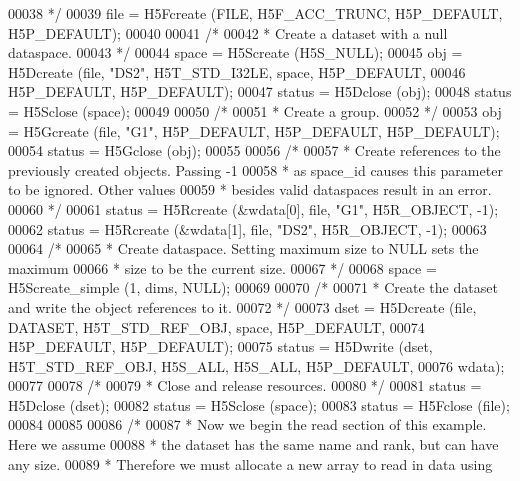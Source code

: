 \begin{DoxyCode}
00038 \textcolor{comment}{     */}
00039     file = H5Fcreate (FILE, H5F\_ACC\_TRUNC, H5P\_DEFAULT, H5P\_DEFAULT);
00040 
00041     \textcolor{comment}{/*}
00042 \textcolor{comment}{     * Create a dataset with a null dataspace.}
00043 \textcolor{comment}{     */}
00044     space = H5Screate (H5S\_NULL);
00045     obj = H5Dcreate (file, \textcolor{stringliteral}{"DS2"}, H5T\_STD\_I32LE, space, H5P\_DEFAULT,
00046                 H5P\_DEFAULT, H5P\_DEFAULT);
00047     status = H5Dclose (obj);
00048     status = H5Sclose (space);
00049 
00050     \textcolor{comment}{/*}
00051 \textcolor{comment}{     * Create a group.}
00052 \textcolor{comment}{     */}
00053     obj = H5Gcreate (file, \textcolor{stringliteral}{"G1"}, H5P\_DEFAULT, H5P\_DEFAULT, H5P\_DEFAULT);
00054     status = H5Gclose (obj);
00055 
00056     \textcolor{comment}{/*}
00057 \textcolor{comment}{     * Create references to the previously created objects.  Passing -1}
00058 \textcolor{comment}{     * as space\_id causes this parameter to be ignored.  Other values}
00059 \textcolor{comment}{     * besides valid dataspaces result in an error.}
00060 \textcolor{comment}{     */}
00061     status = H5Rcreate (&wdata[0], file, \textcolor{stringliteral}{"G1"}, H5R\_OBJECT, -1);
00062     status = H5Rcreate (&wdata[1], file, \textcolor{stringliteral}{"DS2"}, H5R\_OBJECT, -1);
00063 
00064     \textcolor{comment}{/*}
00065 \textcolor{comment}{     * Create dataspace.  Setting maximum size to NULL sets the maximum}
00066 \textcolor{comment}{     * size to be the current size.}
00067 \textcolor{comment}{     */}
00068     space = H5Screate\_simple (1, dims, NULL);
00069 
00070     \textcolor{comment}{/*}
00071 \textcolor{comment}{     * Create the dataset and write the object references to it.}
00072 \textcolor{comment}{     */}
00073     dset = H5Dcreate (file, DATASET, H5T\_STD\_REF\_OBJ, space, H5P\_DEFAULT,
00074                 H5P\_DEFAULT, H5P\_DEFAULT);
00075     status = H5Dwrite (dset, H5T\_STD\_REF\_OBJ, H5S\_ALL, H5S\_ALL, H5P\_DEFAULT,
00076                 wdata);
00077 
00078     \textcolor{comment}{/*}
00079 \textcolor{comment}{     * Close and release resources.}
00080 \textcolor{comment}{     */}
00081     status = H5Dclose (dset);
00082     status = H5Sclose (space);
00083     status = H5Fclose (file);
00084 
00085 
00086     \textcolor{comment}{/*}
00087 \textcolor{comment}{     * Now we begin the read section of this example.  Here we assume}
00088 \textcolor{comment}{     * the dataset has the same name and rank, but can have any size.}
00089 \textcolor{comment}{     * Therefore we must allocate a new array to read in data using}

\end{DoxyCode}
